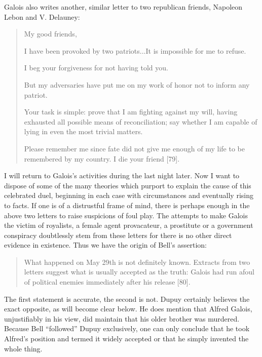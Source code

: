 \documentclass[12pt]{article}
\begin{document}
Galois also writes another, similar letter to two republican friends, Napoleon Lebon and V. Delauney:

\begin{quotation}
\noindent
My good friends, 
\medskip

I have been provoked by two patriots...It is impossible for me to refuse. 

I beg your forgiveness for not having told you. 

But my adversaries have put me on my work of honor not to inform any patriot. 

Your task is simple: prove that I am fighting against my will, having exhausted all possible means of reconciliation; say whether I am capable of lying in even the most trivial matters. 

Please remember me since fate did not give me enough of my life to be remembered by my country. I die your friend [79].
\end{quotation}

I will return to Galois's activities during the last night later. Now I want to dispose of some of the many theories which purport to explain the cause of this celebrated duel, beginning in each case with circumstances and eventually rising to facts. If one is of a distrustful frame of mind, there is perhaps enough in the above two letters to raise suspicions of foul play. The attempts to make Galois the victim of royalists, a female agent provacateur, a prostitute or a government conspiracy doubtlessly stem from these letters for there is no other direct evidence in existence. Thus we have the origin of Bell's assertion:

\begin{quote}
What happened on May 29th is not definitely known. Extracts from two letters suggest what is usually accepted as the truth: Galois had run afoul of political enemies immediately after his release [80].
\end{quote}

The first statement is accurate, the second is not. Dupuy certainly believes the exact opposite, as will become clear below. He does mention that Alfred Galois, unjustifiably in his view, did maintain that his older brother was murdered. Because Bell ``followed'' Dupuy exclusively, one can only conclude that he took Alfred's position and termed it widely accepted or that he simply invented the whole thing.
\end{document}
